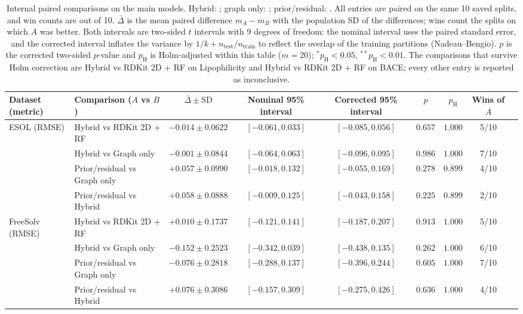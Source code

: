 \begin{table}[H]
\caption{Internal paired comparisons on the main models. Hybrid: ; graph only: ; prior/residual: . All entries are paired on the same 10 saved splits, and win counts are out of 10. $\bar\Delta$ is the mean paired difference $m_A-m_B$ with the population SD of the differences; wins count the splits on which $A$ was better. Both intervals are two-sided $t$ intervals with 9 degrees of freedom: the nominal interval uses the paired standard error, and the corrected interval inflates the variance by $1/k+n_{\mathrm{test}}/n_{\mathrm{train}}$ to reflect the overlap of the training partitions (Nadeau--Bengio). $p$ is the corrected two-sided $p$-value and $p_{\mathrm{H}}$ is Holm-adjusted within this table ($m=20$); $^{*}p_{\mathrm{H}}<0.05$, $^{**}p_{\mathrm{H}}<0.01$. The comparisons that survive Holm correction are Hybrid vs RDKit 2D + RF on Lipophilicity and Hybrid vs RDKit 2D + RF on BACE; every other entry is reported as inconclusive. }\label{tab:int}
\centering\scriptsize
\setlength{\tabcolsep}{4pt}
\begin{tabular}{@{}llccccccc@{}}
\toprule
Dataset (metric) & Comparison ($A$ vs $B$) & $\bar\Delta\pm\mathrm{SD}$ & Nominal 95\% interval & Corrected 95\% interval & $p$ & $p_{\mathrm{H}}$ & Wins of $A$ \\
\midrule
ESOL (RMSE) & Hybrid vs RDKit 2D + RF & $-0.014\pm0.0622$ & $[-0.061,0.033]$ & $[-0.085,0.056]$ & $0.657$ & $1.000$ & 5/10 \\
 & Hybrid vs Graph only & $-0.001\pm0.0844$ & $[-0.064,0.063]$ & $[-0.096,0.095]$ & $0.986$ & $1.000$ & 7/10 \\
 & Prior/residual vs Graph only & $+0.057\pm0.0990$ & $[-0.018,0.132]$ & $[-0.055,0.169]$ & $0.278$ & $0.899$ & 4/10 \\
 & Prior/residual vs Hybrid & $+0.058\pm0.0888$ & $[-0.009,0.125]$ & $[-0.043,0.158]$ & $0.225$ & $0.899$ & 2/10 \\
\midrule
FreeSolv (RMSE) & Hybrid vs RDKit 2D + RF & $+0.010\pm0.1737$ & $[-0.121,0.141]$ & $[-0.187,0.207]$ & $0.913$ & $1.000$ & 5/10 \\
 & Hybrid vs Graph only & $-0.152\pm0.2523$ & $[-0.342,0.039]$ & $[-0.438,0.135]$ & $0.262$ & $1.000$ & 6/10 \\
 & Prior/residual vs Graph only & $-0.076\pm0.2818$ & $[-0.288,0.137]$ & $[-0.396,0.244]$ & $0.605$ & $1.000$ & 7/10 \\
 & Prior/residual vs Hybrid & $+0.076\pm0.3086$ & $[-0.157,0.309]$ & $[-0.275,0.426]$ & $0.636$ & $1.000$ & 4/10 \\

\end{tabular}
\end{table}
